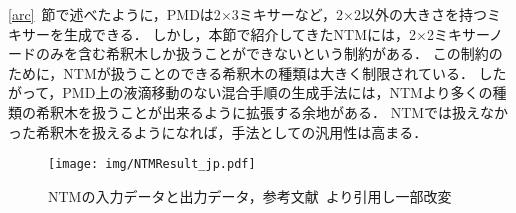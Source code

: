 \ref{arc}~節で述べたように，PMDは2$\times$3ミキサーなど，2$\times$2以外の大きさを持つミキサーを生成できる．
しかし，本節で紹介してきたNTMには，2$\times$2ミキサーノードのみを含む希釈木しか扱うことができないという制約がある．
この制約のために，NTMが扱うことのできる希釈木の種類は大きく制限されている．
したがって，PMD上の液滴移動のない混合手順の生成手法には，NTMより多くの種類の希釈木を扱うことが出来るように拡張する余地がある．
NTMでは扱えなかった希釈木を扱えるようになれば，手法としての汎用性は高まる．
\begin{figure}[tbp]
 \centering\texttt{[image: img/NTMResult\_jp.pdf]}
    \caption{NTMの入力データと出力データ，参考文献~\cite{4}より引用し一部改変}\label{fig:ntmresult}
\end{figure}

